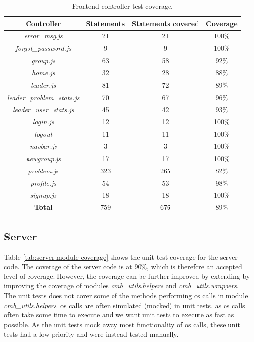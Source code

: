 \begin{table}[t!]
    \centering
    \begin{tabular}{c c c c}
      \hline
      \textbf{Controller} & \textbf{Statements} & \textbf{Statements covered} & \textbf{Coverage} \\ \hline
      \textit{error\_msg.js} & 21 & 21 & 100\% \\
      \textit{forgot\_password.js} & 9 & 9 & 100\% \\
      \textit{group.js} & 63 & 58 & 92\% \\
      \textit{home.js} & 32 & 28 & 88\% \\
      \textit{leader.js} & 81 & 72 & 89\% \\
      \textit{leader\_problem\_stats.js} & 70 & 67 & 96\% \\
      \textit{leader\_user\_stats.js} & 45 & 42 & 93\% \\
      \textit{login.js} & 12 & 12 & 100\% \\
      \textit{logout} & 11 & 11 & 100\% \\
      \textit{navbar.js} & 3 & 3 & 100\% \\
      \textit{newgroup.js} & 17 & 17 & 100\% \\
      \textit{problem.js} & 323 & 265 & 82\% \\
      \textit{profile.js} & 54 & 53 & 98\% \\
      \textit{signup.js} & 18 & 18 & 100\% \\ \hline
      \textbf{Total} & 759 & 676 & 89\% \\ \hline
    \end{tabular}
    \caption{Frontend controller test coverage.}
    \label{tab:frontend-coverage-controllers}
\end{table}

\subsection{Server}
Table \ref{tab:server-module-coverage} shows the unit test coverage for the server code. The coverage of the server code is at 90\%, which is therefore an accepted level of coverage. However, the coverage can be further improved by extending by improving the coverage of modules \textit{cmb\_utils.helpers} and \textit{cmb\_utils.wrappers}. \\

The unit tests does not cover some of the methods performing \gls{os} calls in module \textit{cmb\_utils.helpers}. \gls{os} calls are often simulated (mocked) in unit tests, as \gls{os} calls often take some time to execute and we want unit tests to execute as fast as possible. As the unit tests mock away most functionality of \gls{os} calls, these unit tests had a low priority and were instead tested manually. \\

